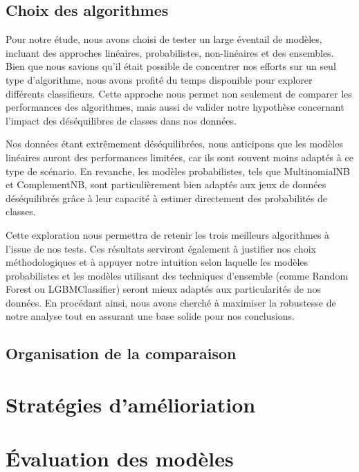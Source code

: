 \documentclass[11pt]{article}
\begin{document}
\subsection{Choix des algorithmes}
Pour notre étude, nous avons choisi de tester un large éventail de modèles, incluant des approches linéaires, probabilistes, non-linéaires et des ensembles. Bien que nous savions qu'il était possible de concentrer nos efforts sur un seul type d'algorithme, nous avons profité du temps disponible pour explorer différents classifieurs. Cette approche nous permet non seulement de comparer les performances des algorithmes, mais aussi de valider notre hypothèse concernant l'impact des déséquilibres de classes dans nos données.

Nos données étant extrêmement déséquilibrées, nous anticipons que les modèles linéaires auront des performances limitées, car ils sont souvent moins adaptés à ce type de scénario. En revanche, les modèles probabilistes, tels que MultinomialNB et ComplementNB, sont particulièrement bien adaptés aux jeux de données déséquilibrés grâce à leur capacité à estimer directement des probabilités de classes.

Cette exploration nous permettra de retenir les trois meilleurs algorithmes à l'issue de nos tests. Ces résultats serviront également à justifier nos choix méthodologiques et à appuyer notre intuition selon laquelle les modèles probabilistes et les modèles utilisant des techniques d'ensemble (comme Random Forest ou LGBMClassifier) seront mieux adaptés aux particularités de nos données. En procédant ainsi, nous avons cherché à maximiser la robustesse de notre analyse tout en assurant une base solide pour nos conclusions.

\subsection{Organisation de la comparaison}

\section{Stratégies d'amélioriation}


\section{Évaluation des modèles}
\end{document}
